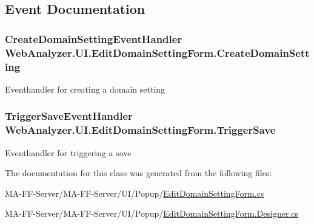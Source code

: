 \subsection{Event Documentation}
\hypertarget{class_web_analyzer_1_1_u_i_1_1_edit_domain_setting_form_a15f150af99974a02e7df872db755b121}{}
\subsubsection[{Create\+Domain\+Setting}]{\setlength{\rightskip}{0pt plus 5cm}Create\+Domain\+Setting\+Event\+Handler Web\+Analyzer.\+U\+I.\+Edit\+Domain\+Setting\+Form.\+Create\+Domain\+Setting}\label{class_web_analyzer_1_1_u_i_1_1_edit_domain_setting_form_a15f150af99974a02e7df872db755b121}


Eventhandler for creating a domain setting 

\hypertarget{class_web_analyzer_1_1_u_i_1_1_edit_domain_setting_form_a1ddda08125c245cc97c50557b40f5fa2}{}
\subsubsection[{Trigger\+Save}]{\setlength{\rightskip}{0pt plus 5cm}Trigger\+Save\+Event\+Handler Web\+Analyzer.\+U\+I.\+Edit\+Domain\+Setting\+Form.\+Trigger\+Save}\label{class_web_analyzer_1_1_u_i_1_1_edit_domain_setting_form_a1ddda08125c245cc97c50557b40f5fa2}


Eventhandler for triggering a save 



The documentation for this class was generated from the following files\+:\begin{DoxyCompactItemize}
\item 
M\+A-\/\+F\+F-\/\+Server/\+M\+A-\/\+F\+F-\/\+Server/\+U\+I/\+Popup/\hyperlink{_edit_domain_setting_form_8cs}{Edit\+Domain\+Setting\+Form.\+cs}\item 
M\+A-\/\+F\+F-\/\+Server/\+M\+A-\/\+F\+F-\/\+Server/\+U\+I/\+Popup/\hyperlink{_edit_domain_setting_form_8_designer_8cs}{Edit\+Domain\+Setting\+Form.\+Designer.\+cs}\end{DoxyCompactItemize}
